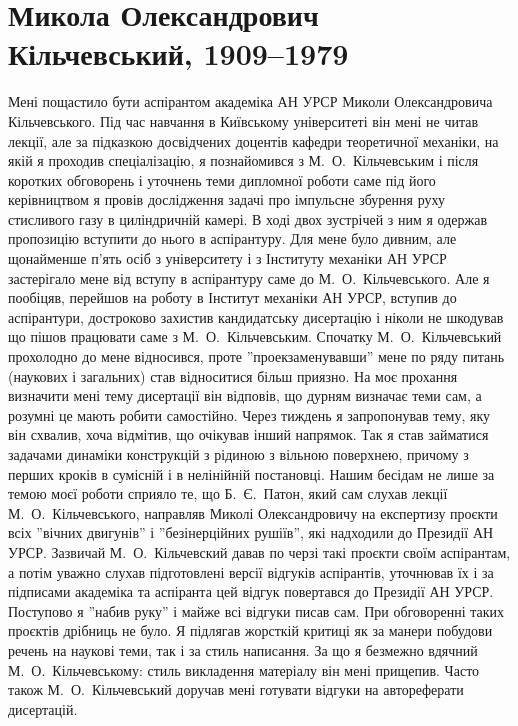 \documentclass[11pt, reqno]{amsart}
\begin{document}
\section{Микола Олександрович Кільчевський, 1909--1979}
Мені пощастило бути аспірантом академіка АН УРСР Миколи Олександровича Кільчевського. Під час навчання в Київському університеті він мені не читав лекції, але за підказкою досвідчених доцентів кафедри теоретичної механіки, на якій я проходив спеціалізацію, я познайомився з М.~О.~Кільчевським і після коротких обговорень і уточнень теми дипломної роботи саме під його керівництвом я провів дослідження задачі про імпульсне збурення руху стисливого газу в циліндричній камері. В ході двох зустрічей з ним я одержав пропозицію вступити до нього в аспірантуру. Для мене було дивним, але щонайменше п'ять осіб з університету і з Інституту механіки АН УРСР застерігало мене від вступу в аспірантуру саме до М.~О.~Кільчевського. Але я пообіцяв, перейшов на роботу в Інститут механіки АН УРСР, вступив до аспірантури, достроково захистив кандидатську дисертацію і ніколи не шкодував що пішов працювати саме з М.~О.~Кільчевським. Спочатку М.~О.~Кільчевський прохолодно до мене відносився, проте ''проекзаменувавши'' мене по ряду питань (наукових і загальних) став відноситися більш приязно. На моє прохання визначити мені тему дисертації він відповів, що дурням визначає теми сам, а розумні це мають робити самостійно. Через тиждень я запропонував тему, яку він схвалив, хоча відмітив, що очікував інший напрямок. Так я став займатися задачами динаміки конструкцій з рідиною з вільною поверхнею, причому з перших кроків в сумісній і в нелінійній постановці. Нашим бесідам не лише за темою моєї роботи сприяло те, що Б.~Є.~Патон, який сам слухав лекції М.~О.~Кільчевського, направляв Миколі Олександровичу на експертизу проєкти всіх ''вічних двигунів'' і ''безінерційних рушіїв'', які надходили до Президії АН УРСР. Зазвичай М.~О.~Кільчевский давав по черзі такі проєкти своїм аспірантам, а потім уважно слухав підготовлені версії відгуків аспірантів, уточнював їх і за підписами академіка та аспіранта цей відгук повертався до Президії АН УРСР. Поступово я ''набив руку'' і майже всі відгуки писав сам. При обговоренні таких проєктів дрібниць не було. Я підлягав жорсткій критиці як за манери побудови речень на наукові теми, так і за стиль написання. За що я безмежно вдячний М.~О.~Кільчевському: стиль викладення матеріалу він мені прищепив. Часто також М.~О.~Кільчевський доручав мені готувати відгуки на автореферати дисертацій.
\end{document}
